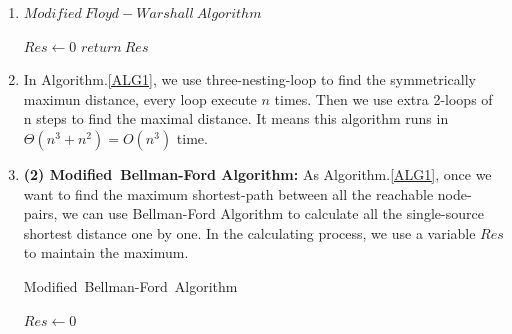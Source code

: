 \documentclass[12pt,a4paper]{article}
\makeatletter
\newtheorem*{solution}{Solution}
\theoremstyle{definition}
\renewenvironment{solution}[1][Solution] {\par\pushQED{\qed}\normalfont\topsep6\p@\@plus6\p@\relax\trivlist\item[\hskip\labelsep\bfseries#1\@addpunct{.}]\ignorespaces}{\popQED\endtrivlist\@endpefalse} \makeatother
\makeatother
\begin{document}
\begin{enumerate}
\begin{solution}
    \begin{minipage}[t]{0.9\textwidth}
        \begin{algorithm}[H]
            \caption{$Modified\ Floyd-Warshall\ Algorithm$}
            \label{ALG1}
            $Res\leftarrow 0$\;
            $return\ Res $\;
        \end{algorithm}
        \end{minipage}
        \hfill
    \item 
    In Algorithm.\ref{ALG1}, we use three-nesting-loop to find the symmetrically maximun distance, every loop execute $n$ times. Then we use extra 2-loops of n steps to find the maximal distance. It means this algorithm runs in $\Theta(n^3+n^2)=O(n^3)$ time.\item

    
    \textbf{(2) Modified\ Bellman-Ford Algorithm: }As Algorithm.\ref{ALG1}, once we want to find the maximum shortest-path between all the reachable node-pairs, we can use Bellman-Ford Algorithm to calculate all the single-source shortest distance one by one. In the calculating process, we use a variable $Res$ to maintain the maximum.
    
    \begin{minipage}[t]{0.9\textwidth}
        \begin{algorithm}[H]
            \caption{Modified\ Bellman-Ford\ Algorithm}
            \label{ALG2}
            \BlankLine
            $Res\leftarrow 0$\;
\end{algorithm}
\end{minipage}
\end{solution}
\end{enumerate}
\end{document}
